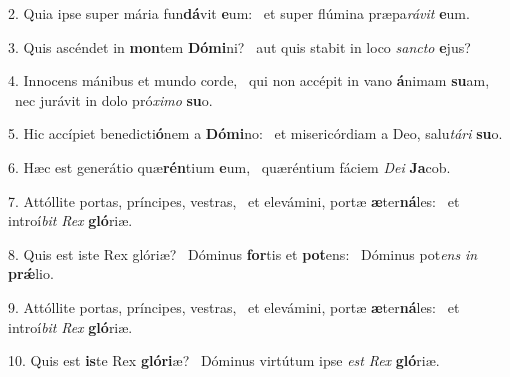 2. Quia ipse super mária fun\textbf{dá}vit \textbf{e}um: \ast\  et super flúmina præpa\textit{rá}\textit{vit} \textbf{e}um.\

3. Quis ascéndet in \textbf{mon}tem \textbf{Dó}\textbf{mi}ni? \ast\  aut quis stabit in loco \textit{sanc}\textit{to} \textbf{e}jus?\

4. Innocens mánibus et mundo corde, \dag\  qui non accépit in vano \textbf{á}nimam \textbf{su}am, \ast\  nec jurávit in dolo pró\textit{xi}\textit{mo} \textbf{su}o.\

5. Hic accípiet benedicti\textbf{ó}nem a \textbf{Dó}\textbf{mi}no: \ast\  et misericórdiam a Deo, salu\textit{tá}\textit{ri} \textbf{su}o.\

6. Hæc est generátio quæ\textbf{rén}tium \textbf{e}um, \ast\  quæréntium fáciem \textit{De}\textit{i} \textbf{Ja}cob.\

7. Attóllite portas, príncipes, vestras, \dag\  et elevámini, portæ \textbf{æ}ter\textbf{ná}les: \ast\  et introí\textit{bit} \textit{Rex} \textbf{gló}riæ.\

8. Quis est iste Rex glóriæ? \dag\  Dóminus \textbf{for}tis et \textbf{pot}ens: \ast\  Dóminus pot\textit{ens} \textit{in} \textbf{prǽ}lio.\

9. Attóllite portas, príncipes, vestras, \dag\  et elevámini, portæ \textbf{æ}ter\textbf{ná}les: \ast\  et introí\textit{bit} \textit{Rex} \textbf{gló}riæ.\

10. Quis est \textbf{is}te Rex \textbf{gló}\textbf{ri}æ? \ast\  Dóminus virtútum ipse \textit{est} \textit{Rex} \textbf{gló}riæ.\


